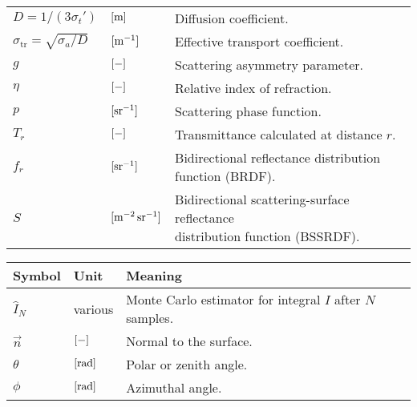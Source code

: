 \begin{tabular*}{\textwidth}{p{}p{}p{}}
$D = 1 / (3 \sigma_t') $ & $[\SI{}{\metre}]$ & Diffusion coefficient. \\                                      
$\sigma_\text{tr} = \sqrt{\sigma_a / D} $ & $[\SI{}{\per \metre}]$ & Effective transport coefficient. \\                                      
$g$ & $[\SI{}{-}]$ & Scattering asymmetry parameter. \\                                      
$\eta$ & $[\SI{}{-}]$ & Relative index of refraction. \\                                      
$p$ & $\siunitnospace{\per \steradian}$ & Scattering phase function. \\                                      
$T_r$ & $[\SI{}{-}]$ & Transmittance calculated at distance $r$. \\                                      
$f_r$ & $\siunitnospace{\per \steradian}$ & \makecell[l] {Bidirectional reflectance distribution \\ function (BRDF).} \\                                      
$S$ & $\siunitnospace{\per \square \metre \per \steradian}$ & \makecell[l]{Bidirectional scattering-surface reflectance \\ distribution function (BSSRDF).} \\ 
\end{tabular*}
\clearpage
\begin{tabular*}{\textwidth}{p{}p{}p{}}
\hline
\rowcolor{alexblue!50}
\textbf{Symbol} & \textbf{Unit} & \textbf{Meaning} \\ \hline
$\hat{I}_N$ & various & \makecell[l]{Monte Carlo estimator for integral $I$ \\ after $N$ samples.} \\
%                                     
$\vec{n}$ & $[\SI{}{-}]$ & Normal to the surface. \\                                      
%
$\theta$ & $[\SI{}{\radian}]$ & Polar or zenith angle. \\                                      
$\phi$ & $[\SI{}{\radian}]$ & Azimuthal angle. \\                                      
\end{tabular*}
